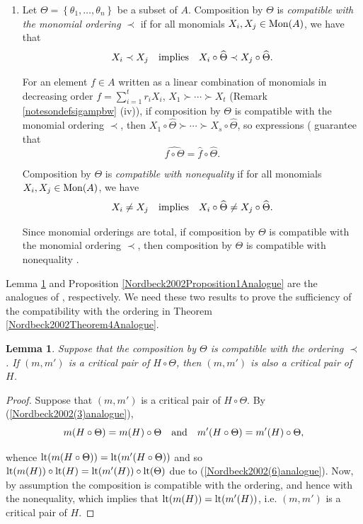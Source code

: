 \documentclass{amsart}
\newtheorem{lemma}[theorem]{Lemma}
\theoremstyle{definition}
\theoremstyle{remark}
\numberwithin{equation}{section}
\begin{document}
\begin{enumerate}
\item [\rm (11)] Let $\Theta = \left\{\theta_1, \dotsc, \theta_n\right\}$ be a subset of $A$. Composition by $\Theta$ is {\em compatible with the monomial ordering} $\prec$ if for all monomials $X_i, X_j\in {\rm Mon}(A)$, we have that 
\begin{equation}\label{Nordbeck2002(7)analogue}
X_i \prec X_j \quad {\rm implies}\quad X_i \circ \widehat{\Theta} \prec X_j \circ \widehat{\Theta}.
\end{equation}

For an element $f\in A$ written as a linear combination of monomials in decreasing order $f = \sum\limits_{i = 1}^t r_iX_i$, $X_1 \succ \dotsb \succ X_t$ (Remark \ref{notesondefsigampbw}  (iv)), if composition by $\Theta$ is compatible with the monomial ordering $\prec$, then $X_1 \circ \widehat{\Theta} \succ \dotsb \succ X_s \circ \widehat{\Theta}$, so expressions (\cite[Remark 4 (5) and (6)]{Nordbeck2002} guarantee that
\begin{equation}\label{Nordbeck2002(8)analogue}
    \widehat{f \circ \Theta} = \widehat{f} \circ \widehat{\Theta}.
\end{equation}

Composition by $\Theta$ is {\em compatible with nonequality} if for all monomials $X_i, X_j \in {\rm Mon}(A)$, we have
\begin{equation}
    X_i\neq X_j\quad {\rm implies}\quad X_i \circ \widehat{\Theta} \neq X_j\circ \widehat{\Theta}.
\end{equation}

Since monomial orderings are total, if composition by $\Theta$ is compatible with the monomial ordering $\prec$, then composition by $\Theta$ is compatible with nonequality \cite[Lemma 1]{Nordbeck2002}.
\end{enumerate}

Lemma \ref{Nordbeck2002Lemma2Analogue} and Proposition \ref{Nordbeck2002Proposition1Analogue} are the analogues of \cite[Lemma 2 and Proposition 1]{Nordbeck2002}, respectively. We need these two results to prove the sufficiency of the compatibility with the ordering in Theorem \ref{Nordbeck2002Theorem4Analogue}.

\begin{lemma}\label{Nordbeck2002Lemma2Analogue}
Suppose that the composition by $\Theta$ is compatible with the ordering $\prec$. If $(m, m')$ is a critical pair of $H \circ \Theta$, then $(m, m')$ is also a critical pair of $H$.
\end{lemma}
\begin{proof}
Suppose that $(m, m')$ is a critical pair of $H \circ \Theta$. By (\ref{Nordbeck2002(3)analogue}), 
$$
m(H \circ \Theta) = m(H) \circ \Theta \quad {\rm and} \quad m'(H\circ \Theta) = m'(H) \circ \Theta, 
$$ 

whence ${\rm lt}(m (H \circ \Theta)) = {\rm lt} (m'(H\circ \Theta))$ and so ${\rm lt}(m(H)) \circ {\rm lt}(H) = {\rm lt}(m'(H)) \circ {\rm lt}(\Theta)$ due to (\ref{Nordbeck2002(6)analogue}). Now, by assumption the composition is compatible with the ordering, and hence with the nonequality, which implies that ${\rm lt}(m(H)) = {\rm lt} (m'(H))$, i.e. $(m, m')$ is a critical pair of $H$.
\end{proof}
\end{document}
